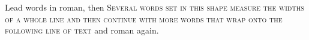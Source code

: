 \documentclass{article}
\begin{document}
Lead words in roman, then \textsc{Several words set in this shape measure the widths of a whole line and then continue with more words that wrap onto the following line of text} and roman again.
\end{document}
